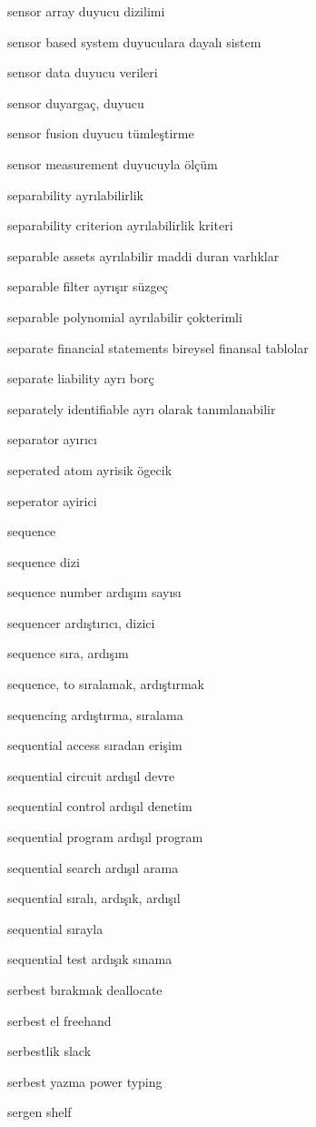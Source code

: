 \documentclass[12pt,fleqn]{article}\usepackage{../../common}
\begin{document}
sensor array duyucu dizilimi

sensor based system duyuculara dayalı sistem

sensor data duyucu verileri

sensor duyargaç, duyucu

sensor fusion duyucu tümleştirme

sensor measurement duyucuyla ölçüm

separability ayrılabilirlik

separability criterion ayrılabilirlik kriteri

separable assets ayrılabilir maddi duran varlıklar

separable filter ayrışır süzgeç

separable polynomial ayrılabilir çokterimli

separate financial statements bireysel finansal tablolar

separate liability ayrı borç

separately identifiable ayrı olarak tanımlanabilir

separator ayırıcı

seperated atom ayrisik ögecik

seperator ayirici

sequence

sequence dizi

sequence number ardışım sayısı

sequencer ardıştırıcı, dizici

sequence sıra, ardışım

sequence, to sıralamak, ardıştırmak

sequencing ardıştırma, sıralama

sequential access sıradan erişim

sequential circuit ardışıl devre

sequential control ardışıl denetim

sequential program ardışıl program

sequential search ardışıl arama

sequential sıralı, ardışık, ardışıl

sequential sırayla

sequential test ardışık sınama

serbest bırakmak deallocate

serbest el freehand

serbestlik slack

serbest yazma power typing

sergen shelf
\end{document}
